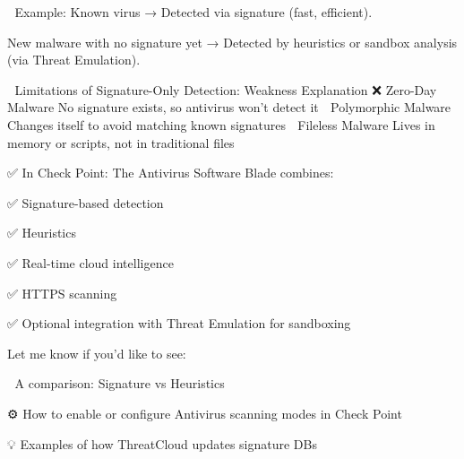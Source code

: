 📘 Example:
Known virus → Detected via signature (fast, efficient).

New malware with no signature yet → Detected by heuristics or sandbox analysis (via Threat Emulation).

🚫 Limitations of Signature-Only Detection:
Weakness	Explanation
❌ Zero-Day Malware	No signature exists, so antivirus won't detect it
🔁 Polymorphic Malware	Changes itself to avoid matching known signatures
🦠 Fileless Malware	Lives in memory or scripts, not in traditional files

✅ In Check Point:
The Antivirus Software Blade combines:

✅ Signature-based detection

✅ Heuristics

✅ Real-time cloud intelligence

✅ HTTPS scanning

✅ Optional integration with Threat Emulation for sandboxing

Let me know if you’d like to see:

🧪 A comparison: Signature vs Heuristics

⚙️ How to enable or configure Antivirus scanning modes in Check Point

💡 Examples of how ThreatCloud updates signature DBs



